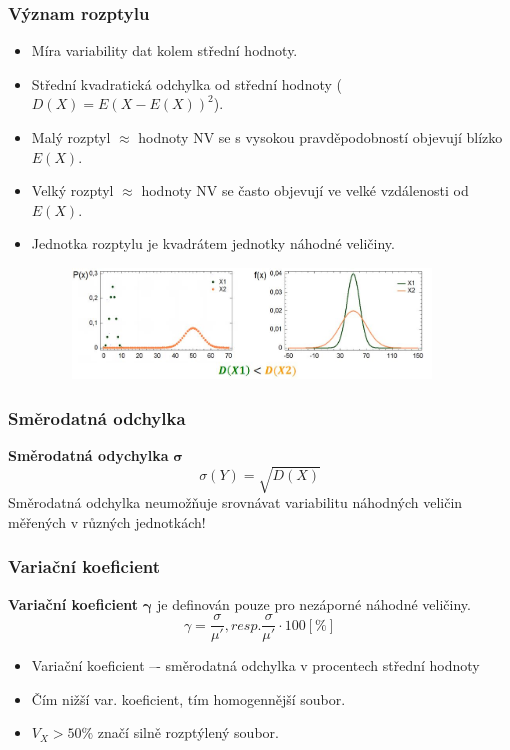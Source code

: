 \subsubsection{Význam rozptylu}
\begin{itemize}
	\item Míra variability dat kolem střední hodnoty.
	\item Střední kvadratická odchylka od střední hodnoty ($D(X) = E(X - E(X))^2$).
	\item Malý rozptyl $\approx$ hodnoty NV se s vysokou pravděpodobností objevují blízko $E(X)$.
	\item Velký rozptyl $\approx$ hodnoty NV se často objevují ve velké vzdálenosti od $E(X)$.
	\item Jednotka rozptylu je kvadrátem jednotky náhodné veličiny.
	\begin{figure}[H]
			\centering
			\includegraphics[width=0.9\textwidth]{assets/11_rozptyl}
	\end{figure}
\end{itemize}

\subsubsection{Směrodatná odchylka}
\textbf{Směrodatná odychylka} $\mathbf{\sigma}$ $$\sigma(Y) = \sqrt{D(X)}$$
Směrodatná odchylka neumožňuje srovnávat variabilitu náhodných veličin měřených v různých jednotkách! 

\subsubsection{Variační koeficient}
\textbf{Variační koeficient} $\mathbf{\gamma}$ je definován pouze pro nezáporné náhodné veličiny. $$\gamma = \frac{\sigma}{\mu'}, resp. \frac{\sigma}{\mu'} \cdot 100 [\%]$$
\begin{itemize}
	\item Variační koeficient –- směrodatná odchylka v procentech střední hodnoty
	\item Čím nižší var. koeficient, tím homogennější soubor.
	\item $V_X > 50\%$ značí silně rozptýlený soubor.
\end{itemize}